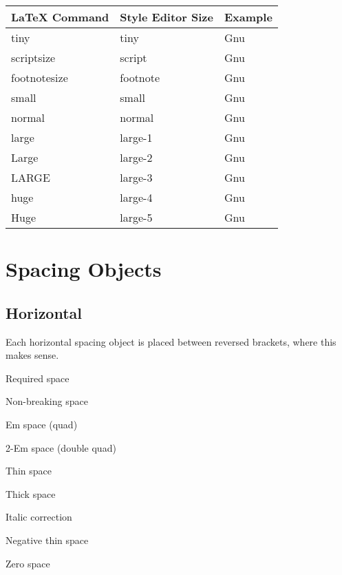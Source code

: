 \documentclass{article}
\begin{document}
\begin{center}
\begin{tabular}{lll}
\textbf{\LaTeX{} Command} & \textbf{Style Editor Size} & \textbf{Example} \\ 
\hline
\TEXTsymbol{\backslash}tiny & tiny & {\tiny Gnu} \\ 
\TEXTsymbol{\backslash}scriptsize & script & {\scriptsize Gnu} \\ 
\TEXTsymbol{\backslash}footnotesize & footnote & {\footnotesize Gnu} \\ 
\TEXTsymbol{\backslash}small & small & {\small Gnu} \\ 
\TEXTsymbol{\backslash}normal & normal & {\normalsize Gnu} \\ 
\TEXTsymbol{\backslash}large & large-1 & {\large Gnu} \\ 
\TEXTsymbol{\backslash}Large & large-2 & {\Large Gnu} \\ 
\TEXTsymbol{\backslash}LARGE & large-3 & {\LARGE Gnu} \\ 
\TEXTsymbol{\backslash}huge & large-4 & {\huge Gnu} \\ 
\TEXTsymbol{\backslash}Huge & large-5 & {\Huge Gnu}%
\end{tabular}
\end{center}

\section{Spacing Objects}

\subsection{Horizontal}

Each horizontal spacing object is placed between reversed brackets, where
this makes sense.

Required space \rbrack\ \lbrack

Non-breaking space \rbrack ~\lbrack

Em space (quad) \rbrack \quad \lbrack

2-Em space (double quad) \rbrack \qquad \lbrack

Thin space \rbrack \thinspace \lbrack

Thick space \rbrack \ \lbrack

Italic correction \rbrack \/\lbrack

Negative thin space \rbrack \negthinspace \lbrack

Zero space \rbrack {}\lbrack
\end{document}
